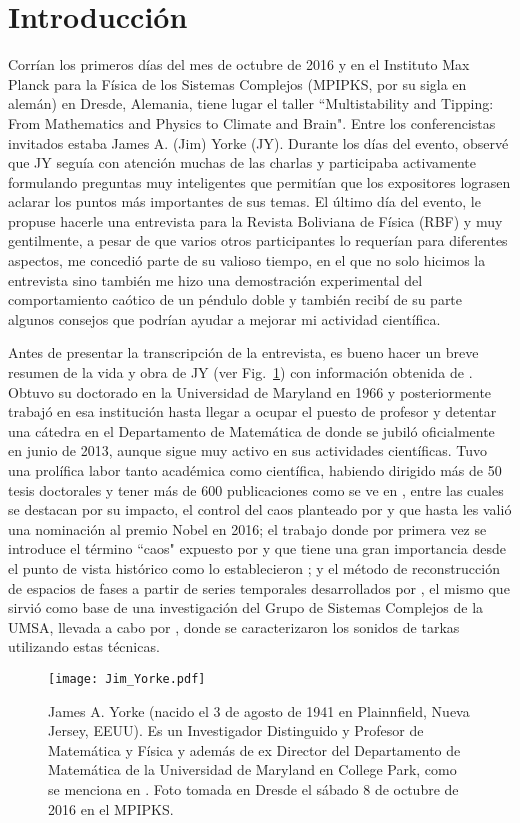 \documentclass{rbf}
\begin{document}
\section{Introducción}\label{intro}
Corrían los primeros días del mes de octubre de 2016 y en el Instituto Max Planck para la Física de los Sistemas Complejos (MPIPKS, por su sigla en alemán) en Dresde, Alemania, tiene lugar el taller ``Multistability and Tipping: From Mathematics and Physics to Climate and Brain". Entre los conferencistas invitados estaba James A. (Jim) Yorke (JY). Durante los días del evento, observé que JY seguía con  atención muchas de las charlas y participaba activamente formulando preguntas muy inteligentes que permitían que los expositores lograsen aclarar los puntos más importantes de sus temas. El último día del evento, le propuse hacerle una entrevista para la Revista Boliviana de Física (RBF) y muy gentilmente, a pesar de que varios otros participantes lo requerían para diferentes aspectos, me concedió parte de su valioso tiempo, en el que no solo hicimos la entrevista sino también me hizo una demostración experimental del comportamiento caótico de un péndulo doble y también recibí de su parte algunos consejos que podrían ayudar a mejorar mi actividad científica.

Antes de presentar la transcripción de la entrevista, es bueno hacer un breve resumen de la vida y obra de JY (ver Fig.~\ref{JY}) con información obtenida de \cite{WIKI17}. Obtuvo su doctorado en la Universidad de Maryland en 1966 y posteriormente trabajó en esa institución hasta llegar a ocupar el puesto de profesor y detentar una cátedra en el Departamento de Matemática de donde se jubiló oficialmente en junio de 2013, aunque sigue muy activo en sus actividades científicas. Tuvo una prolífica labor tanto académica como científica, habiendo dirigido más de 50 tesis doctorales y tener más de 600 publicaciones como se ve en \cite{GS17}, entre las cuales se destacan por su impacto, el control del caos planteado por \cite{OTT90} y que hasta les valió una nominación al premio Nobel en 2016; el trabajo donde por primera vez se introduce el término ``caos" expuesto por \cite{LI75} y que tiene una gran importancia desde el punto de vista histórico como lo establecieron \cite{AUBIN02}; y el método de reconstrucción de espacios de fases a partir de series temporales desarrollados por \cite{SAUER91}, el mismo que sirvió como base de una investigación del Grupo de Sistemas Complejos de la UMSA, llevada a cabo por \cite{GERARD16}, donde se caracterizaron los sonidos de tarkas utilizando estas técnicas.
\begin{figure}[htbp!]
 \centering
  \texttt{[image: Jim\_Yorke.pdf]}
 \caption{James A. Yorke (nacido el 3 de agosto de 1941 en Plainnfield, Nueva Jersey, EEUU). Es un Investigador Distinguido y Profesor de Matemática y Física y además de ex Director del Departamento de Matemática de la Universidad de Maryland en College Park, como se menciona en \cite{WIKI17}. Foto tomada en Dresde el sábado 8 de octubre de 2016 en el MPIPKS.}
 \label{JY}
\end{figure}
\end{document}
